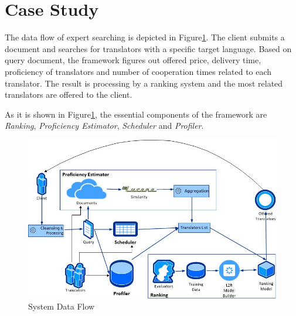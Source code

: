 \section{Case Study}
\label{sec:casestudy}
The data flow of expert searching is depicted in Figure\ref{fig:architecture}. The client submits a document and searches for translators with a specific target language. Based on query document, the framework figures out offered price, delivery time, proficiency of translators and number of cooperation times related to each translator. The result is processing by a ranking system and the most related translators are offered to the client.

As it is shown in Figure\ref{fig:architecture}, the essential components of the framework are \textit{Ranking}, \textit{Proficiency Estimator}, \textit{Scheduler} and \textit{Profiler}.

\begin{figure}[h]
\begin{center}
\includegraphics[scale=0.8]{figures/dataflow.jpg}
\caption{System Data Flow
\label{fig:architecture}}
\end{center}
\end{figure}

